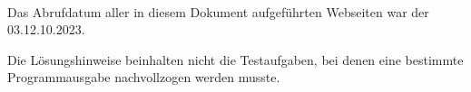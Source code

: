 \Hinweise

\paragraph*{}

Das Abrufdatum aller in diesem Dokument aufgeführten Webseiten war der 03.12.10.2023.

Die Lösungshinweise beinhalten nicht die Testaufgaben, bei denen eine bestimmte Programmausgabe nachvollzogen werden musste.